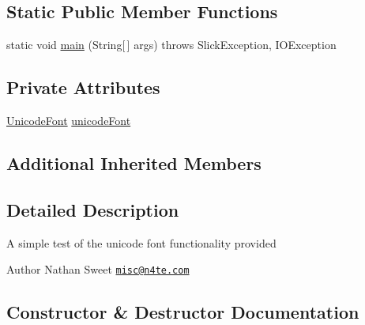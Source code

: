 \subsection*{Static Public Member Functions}
\begin{DoxyCompactItemize}
\item 
static void \mbox{\hyperlink{classorg_1_1newdawn_1_1slick_1_1tests_1_1_unicode_font_test_af8fbcbcffdd9183de80c038290720c92}{main}} (String\mbox{[}$\,$\mbox{]} args)  throws Slick\+Exception, I\+O\+Exception 
\end{DoxyCompactItemize}
\subsection*{Private Attributes}
\begin{DoxyCompactItemize}
\item 
\mbox{\hyperlink{classorg_1_1newdawn_1_1slick_1_1_unicode_font}{Unicode\+Font}} \mbox{\hyperlink{classorg_1_1newdawn_1_1slick_1_1tests_1_1_unicode_font_test_a665bec7950c1a7d41d3cf6c81cbdb880}{unicode\+Font}}
\end{DoxyCompactItemize}
\subsection*{Additional Inherited Members}


\subsection{Detailed Description}
A simple test of the unicode font functionality provided

\begin{DoxyAuthor}{Author}
Nathan Sweet \href{mailto:misc@n4te.com}{\tt misc@n4te.\+com} 
\end{DoxyAuthor}


\subsection{Constructor \& Destructor Documentation}
\mbox{\label{classorg_1_1newdawn_1_1slick_1_1tests_1_1_unicode_font_test_ac21683decce5c4a0fd9cf077aa2261df}} 
